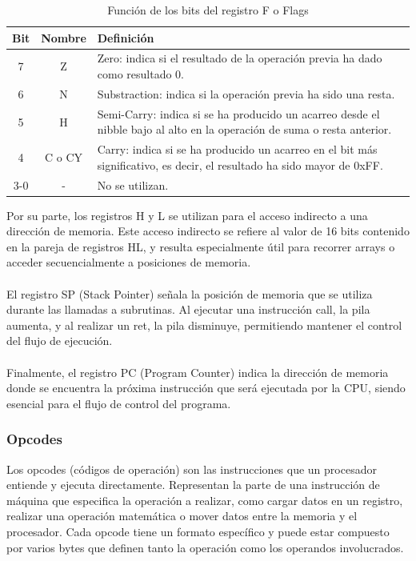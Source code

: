 \begin{table}[H]
    \centering
    \begin{tabular}{|c|c|>{\centering\arraybackslash}p{9cm}|}
        \hline
        \textbf{Bit} & \textbf{Nombre} & \textbf{Definición} \\
        \hline
        7 & Z & Zero: indica si el resultado de la operación previa ha dado como resultado 0. \\
        \hline
        6 & N & Substraction: indica si la operación previa ha sido una resta. \\
        \hline
        5 & H & Semi-Carry: indica si se ha producido un acarreo desde el nibble bajo al alto en la operación de suma o resta anterior. \\
        \hline
        4 & C o CY & Carry: indica si se ha producido un acarreo en el bit más significativo, es decir, el resultado ha sido mayor de 0xFF. \\
        \hline
        3-0 & - & No se utilizan. \\
        \hline
    \end{tabular}
    \caption{Función de los bits del registro F o Flags}
\end{table}

Por su parte, los registros H y L se utilizan para el acceso indirecto a una dirección de memoria. Este acceso indirecto se refiere al valor de 16 bits contenido en la pareja de registros HL, y resulta especialmente útil para recorrer arrays o acceder secuencialmente a posiciones de memoria.
\\\\
El registro SP (Stack Pointer) señala la posición de memoria que se utiliza durante las llamadas a subrutinas. Al ejecutar una instrucción call, la pila aumenta, y al realizar un ret, la pila disminuye, permitiendo mantener el control del flujo de ejecución.
\\\\
Finalmente, el registro PC (Program Counter) indica la dirección de memoria donde se encuentra la próxima instrucción que será ejecutada por la CPU, siendo esencial para el flujo de control del programa.

\subsubsection{Opcodes}

Los opcodes (códigos de operación) son las instrucciones que un procesador entiende y ejecuta directamente. Representan la parte de una instrucción de máquina que especifica la operación a realizar, como cargar datos en un registro, realizar una operación matemática o mover datos entre la memoria y el procesador. Cada opcode tiene un formato específico y puede estar compuesto por varios bytes que definen tanto la operación como los operandos involucrados.

